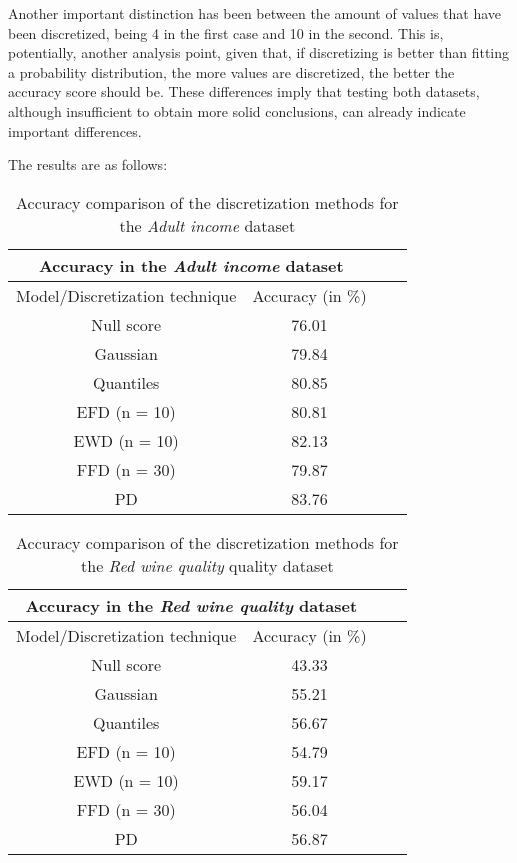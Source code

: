 \documentclass{article}
\begin{document}
Another important distinction has been between the amount of values that have been discretized, being 4 in the first case and 10 in the second. This is, potentially, another analysis point, given that, if discretizing is better than fitting a probability distribution, the more values are discretized, the better the accuracy score should be. These differences imply that testing both datasets, although insufficient to obtain more solid conclusions, can already indicate important differences. 



The results are as follows:
\begin{table}[h!]
\centering
    \begin{tabular}{|c||c|c|c|}
         \hline
         \multicolumn{2}{|c|}{Accuracy in the \emph{Adult income} dataset} \\
         \hline
         Model/Discretization technique & Accuracy (in \%)\\
         \hline
         Null score & 76.01\\
         \hline
         Gaussian & 79.84\\
         \hline
         Quantiles & 80.85\\
         \hline
         EFD (n = 10) & 80.81\\
         \hline
         EWD (n = 10) & 82.13\\
         \hline
         FFD (n = 30) & 79.87\\
         \hline
         PD & 83.76\\
         \hline
    \end{tabular}
\caption{Accuracy comparison of the discretization methods for the \emph{Adult income} dataset}
\label{table:1}
\end{table}

\begin{table}[h!]
\centering
    \begin{tabular}{|c||c|c|c|}
         \hline
         \multicolumn{2}{|c|}{Accuracy in the \emph{Red wine quality} dataset} \\
         \hline
         Model/Discretization technique & Accuracy (in \%)\\
         \hline
         Null score & 43.33\\
         \hline
         Gaussian & 55.21\\
         \hline
         Quantiles & 56.67\\
         \hline
         EFD (n = 10) & 54.79\\
         \hline
         EWD (n = 10) & 59.17\\
         \hline
         FFD (n = 30) & 56.04\\
         \hline
         PD & 56.87\\
         \hline
    \end{tabular}
\caption{Accuracy comparison of the discretization methods for the \emph{Red wine quality} quality dataset}
\label{table:1}
\end{table}
\end{document}
